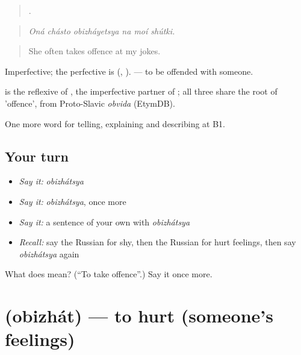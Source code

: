 \begin{quote}
     .
\end{quote}

\begin{quote}
\emph{Oná chásto obizháyetsya na moí shútki.}
\end{quote}

\begin{quote}
She often takes offence at my jokes.
\end{quote}

Imperfective; the perfective is  (, ). \emph{  } — to be offended with someone.

\begin{cousinweb}
\emph{} is the reflexive of \emph{}, the imperfective partner of \emph{}; all three share the root of \emph{} 'offence', from Proto-Slavic \emph{obvida} (EtymDB).
\end{cousinweb}

\begin{grammarlens}[title={What you've built}]
One more word for telling, explaining and describing at B1.
\end{grammarlens}

\subsection*{Your turn}
\begin{itemize}
\raggedright
  \item \emph{Say it:} \emph{obizhátsya}
  \item \emph{Say it:} \emph{obizhátsya}, once more
  \item \emph{Say it:} a sentence of your own with \emph{obizhátsya}
  \item \emph{Recall:} say the Russian for shy, then the Russian for hurt feelings, then say \emph{obizhátsya} again
\end{itemize}

\begin{tcolorbox}[breakable,colback=teal!4,colframe=teal!35!black,title={Before you move on}]
What does  mean? (\textquotedblleft{}To take offence\textquotedblright{}.) Say it once more.
\end{tcolorbox}
\section[\texorpdfstring{\ru{обижать} (obizhát)}{обижать (obizhát)}]{ (obizhát) — to hurt (someone's feelings)}

